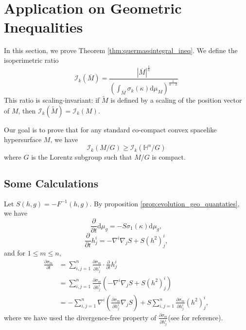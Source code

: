 \documentclass[reqno]{amsart}
\theoremstyle{remark}
\newcommand{\abs}[1]{\left\lvert{#1}\right\rvert}
\newcommand{\dd}{\ensuremath{\text{d}}}
\renewcommand{\H}{{\mathbb{H}}}
\newcommand{\pd}[2]{\frac{\partial {#1}}{\partial {#2}}}
\theoremstyle{definition}
\numberwithin{equation}{section}
\begin{document}
\section{Application on Geometric Inequalities}
In this section, we prove Theorem \ref{thm:quermassintegral_ineq}. We define the isoperimetric ratio 
\begin{equation}
    \mathcal{I}_k(\overline{M}) = \frac{\abs{\overline{M}}^{\frac{1}{n}}}{\left( \int_{\overline{M}} \sigma_k(\kappa) \dd \mu_M \right)^{\frac{1}{n-k}}}
\end{equation}
This ratio is scaling-invariant: if \(\widetilde{M}\) is defined by a scaling of the position vector of \(M\), then \(\mathcal{I}_k(\widetilde{M}) = \mathcal{I}_k(M)\). 

Our goal is  to prove that for any standard co-compact convex spacelike hypersurface \(M\), we have
\begin{equation}
    \mathcal{I}_k(M / G) \geq \mathcal{I}_k(\H^n / G)
\end{equation}
where \(G\) is the Lorentz subgroup such that \(M / G\) is compact. 

\subsection{Some Calculations}
Let \(S(h,g) = -F^{-1}(h,g)\). By proposition \ref{prop:evolution_geo_quantaties}, we have 
\begin{equation}
    \pd{}{t}\dd \mu_g = -S\sigma_1(\kappa)\dd \mu_g,
\end{equation}
\begin{equation}
    \pd{}{t}h_j^i = -\nabla^i\nabla_j S + S(h^2)_j^i,
\end{equation}
and for \(1\leq m\leq n\),
\begin{equation}
    \begin{aligned}
        \pd{\sigma_m}{t} &= \sum_{i,j=1}^{n} \pd{\sigma_m}{h_j^i}\cdot\pd{}{t}h_j^i \\
        &= \sum_{i,j=1}^{n} \pd{\sigma_m}{h_j^i}\left( -\nabla^i\nabla_j S + S(h^2)_j^i \right) \\
        &= -\sum_{i,j=1}^{n} \nabla^i\left(\pd{\sigma_m}{h_j^i} \nabla_j S \right) + S\sum_{i,j=1}^{n} \pd{\sigma_m}{h_j^i}(h^2)_j^i,
    \end{aligned}
\end{equation}
where we have used the divergence-free property of \(\pd{\sigma_m}{h_j^i}\)(see \cite{R.Reilly1974} for reference).
\end{document}
